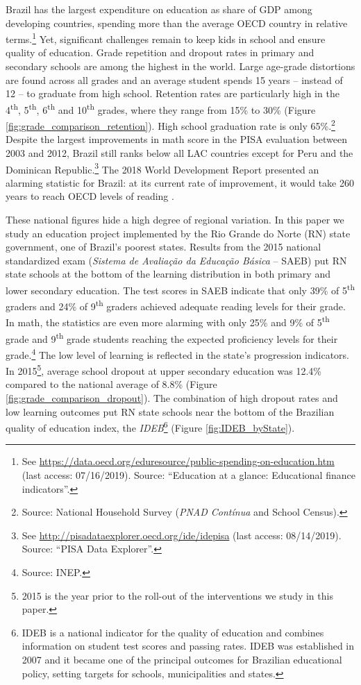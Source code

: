 \documentclass[11pt,a4paper]{article}
\begin{document}
Brazil has the largest expenditure on education as share of GDP among developing countries, spending more than the average OECD country in relative terms.\footnote{See \url{https://data.oecd.org/eduresource/public-spending-on-education.htm} (last access: 07/16/2019). Source: ``Education at a glance: Educational finance indicators''.} Yet, significant challenges remain to keep kids in school and ensure quality of education. Grade repetition and dropout rates in primary and secondary schools are among the highest in the world. Large age-grade distortions are found across all grades and an average student spends 15 years -- instead of 12 -- to graduate from high school. Retention rates are particularly high in the 4\textsuperscript{th}, 5\textsuperscript{th}, 6\textsuperscript{th} and 10\textsuperscript{th} grades, where they range from 15\% to 30\% (Figure \ref{fig:grade_comparison_retention}). High school graduation rate is only 65\%.\footnote{Source: National Household Survey (\textit{PNAD Contínua} and School Census).} Despite the largest improvements in math score in the PISA evaluation between 2003 and 2012, Brazil still ranks below all LAC countries except for Peru and the Dominican Republic.\footnote{See \url{http://pisadataexplorer.oecd.org/ide/idepisa} (last access: 08/14/2019). Source: ``PISA Data Explorer''.} The 2018 World Development Report presented an alarming statistic for Brazil: at its current rate of improvement, it would take 260 years to reach OECD levels of reading \citep{WDR2018}. 

These national figures hide a high degree of regional variation. In this paper we study an education project implemented by the Rio Grande do Norte (RN) state government, one of Brazil's poorest states. Results from the 2015 national standardized exam (\textit{Sistema de Avaliação da Educação Básica} -- SAEB) put RN state schools at the bottom of the learning distribution in both primary and lower secondary education. The test scores in SAEB indicate that only 39\% of 5\textsuperscript{th} graders and 24\% of 9\textsuperscript{th} graders achieved adequate reading levels for their grade. In math, the statistics are even more alarming with only 25\% and 9\% of 5\textsuperscript{th} grade and 9\textsuperscript{th} grade students reaching the expected proficiency levels for their grade.\footnote{Source: INEP.} The low level of learning is reflected in the state's progression indicators. In 2015\footnote{2015 is the year prior to the roll-out of the interventions we study in this paper.}, average school dropout at upper secondary education was 12.4\% compared to the national average of 8.8\% (Figure \ref{fig:grade_comparison_dropout}). The combination of high dropout rates and low learning outcomes put RN state schools near the bottom of the Brazilian quality of education index, the \textit{IDEB}\footnote{IDEB is a national indicator for the quality of education and combines information on student test scores and passing rates. IDEB was established in 2007 and it became one of the principal outcomes for Brazilian educational policy, setting targets for schools, municipalities and states.} (Figure \ref{fig:IDEB_byState}).
\end{document}
